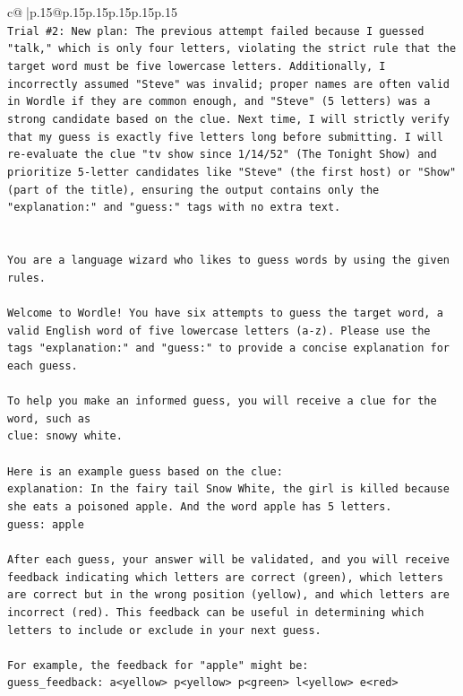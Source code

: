\documentclass{article}
\begin{document}
{\begin{supertabular}{c@{$\;$}|p{.15\linewidth}@{}p{.15\linewidth}p{.15\linewidth}p{.15\linewidth}p{.15\linewidth}p{.15\linewidth}}
{{{\\ 
\texttt{Trial \#2: New plan: The previous attempt failed because I guessed "talk," which is only four letters, violating the strict rule that the target word must be five lowercase letters. Additionally, I incorrectly assumed "Steve" was invalid; proper names are often valid in Wordle if they are common enough, and "Steve" (5 letters) was a strong candidate based on the clue. Next time, I will strictly verify that my guess is exactly five letters long before submitting. I will re{-}evaluate the clue "tv show since 1/14/52" (The Tonight Show) and prioritize 5{-}letter candidates like "Steve" (the first host) or "Show" (part of the title), ensuring the output contains only the "explanation:" and "guess:" tags with no extra text.} \\
\\ 
\\ 
\texttt{You are a language wizard who likes to guess words by using the given rules.} \\
\\ 
\texttt{Welcome to Wordle! You have six attempts to guess the target word, a valid English word of five lowercase letters (a{-}z). Please use the tags "explanation:" and "guess:" to provide a concise explanation for each guess.} \\
\\ 
\texttt{To help you make an informed guess, you will receive a clue for the word, such as} \\
\texttt{clue: snowy white.} \\
\\ 
\texttt{Here is an example guess based on the clue:} \\
\texttt{explanation: In the fairy tail Snow White, the girl is killed because she eats a poisoned apple. And the word apple has 5 letters.} \\
\texttt{guess: apple} \\
\\ 
\texttt{After each guess, your answer will be validated, and you will receive feedback indicating which letters are correct (green), which letters are correct but in the wrong position (yellow), and which letters are incorrect (red). This feedback can be useful in determining which letters to include or exclude in your next guess.} \\
\\ 
\texttt{For example, the feedback for "apple" might be:} \\
\texttt{guess\_feedback: a<yellow> p<yellow> p<green> l<yellow> e<red>} \\
}}}
\end{supertabular}}
\end{document}
